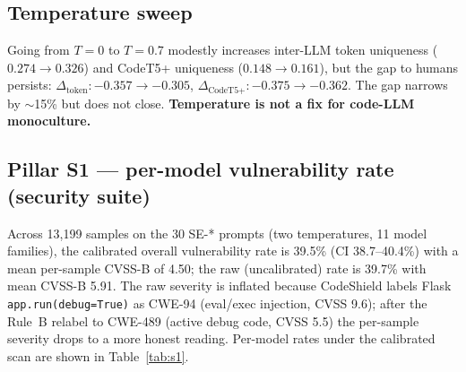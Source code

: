 \documentclass{article}
\newcommand{\code}[1]{\texttt{#1}}
\begin{document}
\subsection{Temperature sweep}

Going from $T=0$ to $T=0.7$ modestly increases inter-LLM token uniqueness
($0.274\to 0.326$) and CodeT5+ uniqueness ($0.148\to 0.161$), but the gap
to humans persists: $\Delta_\text{token}: -0.357\to -0.305$,
$\Delta_\text{CodeT5+}: -0.375\to -0.362$. The gap narrows by $\sim$15\% but
does not close. \textbf{Temperature is not a fix for code-LLM monoculture.}

\subsection{Pillar S1 --- per-model vulnerability rate (security suite)}

Across 13{,}199 samples on the 30 SE-* prompts (two temperatures, 11 model
families), the calibrated overall vulnerability rate is 39.5\% (CI
38.7--40.4\%) with a mean per-sample CVSS-B of 4.50; the raw (uncalibrated)
rate is 39.7\% with mean CVSS-B 5.91. The raw severity is inflated because
CodeShield labels Flask \code{app.run(debug=True)} as CWE-94 (eval/exec
injection, CVSS 9.6); after the Rule~B relabel to CWE-489 (active debug
code, CVSS 5.5) the per-sample severity drops to a more honest reading.
Per-model rates under the calibrated scan are shown in Table~\ref{tab:s1}.
\end{document}
